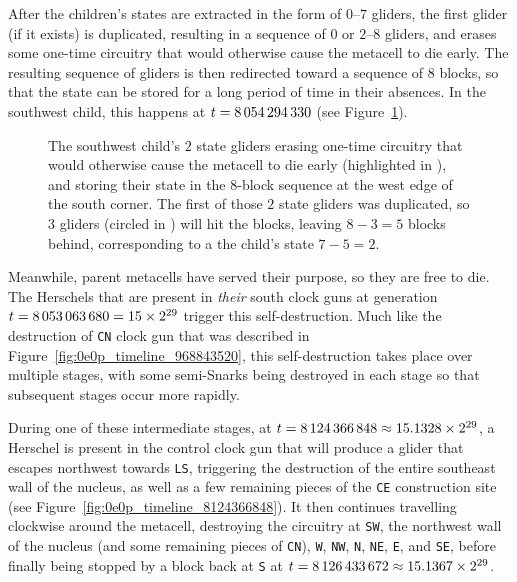 After the children's states are extracted in the form of $0$--$7$ gliders, the first glider (if it exists) is duplicated, resulting in a sequence of $0$ or $2$--$8$ gliders, and erases some one-time circuitry that would otherwise cause the metacell to die early. The resulting sequence of gliders is then redirected toward a sequence of $8$ blocks, so that the state can be stored for a long period of time in their absences. In the southwest child, this happens at $t = 8{\,}054{\,}294{\,}330$ (see Figure~\ref{fig:0e0p_timeline_8054294330}).

\begin{figure}[!htb]
	\centering
	\caption{The southwest child's $2$ state gliders erasing one-time circuitry that would otherwise cause the metacell to die early (highlighted in ), and storing their state in the $8$-block sequence at the west edge of the south corner. The first of those $2$ state gliders was duplicated, so $3$ gliders (circled in ) will hit the blocks, leaving $8-3 = 5$ blocks behind, corresponding to a the child's state $7 - 5 = 2$.}
	\label{fig:0e0p_timeline_8054294330}
\end{figure}


Meanwhile, parent metacells have served their purpose, so they are free to die. The Herschels that are present in \emph{their} south clock guns at generation $t = 8{\,}053{\,}063{\,}680 = 15 \times 2^{29}$ trigger this self-destruction. Much like the destruction of \texttt{CN} clock gun that was described in Figure~\ref{fig:0e0p_timeline_968843520}, this self-destruction takes place over multiple stages, with some semi-Snarks being destroyed in each stage so that subsequent stages occur more rapidly.

During one of these intermediate stages, at $t = 8{\,}124{\,}366{\,}848 \approx 15.1328 \times 2^{29}$, a Herschel is present in the control clock gun that will produce a glider that escapes northwest towards \texttt{LS}, triggering the destruction of the entire southeast wall of the nucleus, as well as a few remaining pieces of the \texttt{CE} construction site (see Figure~\ref{fig:0e0p_timeline_8124366848}). It then continues travelling clockwise around the metacell, destroying the circuitry at \texttt{SW}, the northwest wall of the nucleus (and some remaining pieces of \texttt{CN}), \texttt{W}, \texttt{NW}, \texttt{N}, \texttt{NE}, \texttt{E}, and \texttt{SE}, before finally being stopped by a block back at \texttt{S} at $t = 8{\,}126{\,}433{\,}672 \approx 15.1367 \times 2^{29}$.

